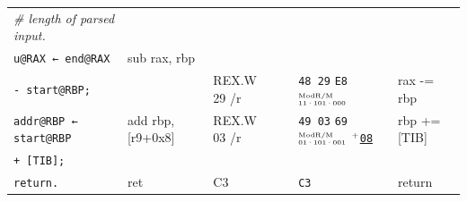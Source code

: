 \documentclass[a4paper,12pt,final]{article}
\begin{document}
\begin{table}[!htbp]
\begin{adjustwidth}{-1cm}{-1cm}
\begin{center}
\begin{tabular}{l|ll|l|lH}
\hspace{1.053000em} \emph{\# length of parsed input.} &  &  &  &  & \\[0pt]
\hspace{1.053000em} \texttt{u@RAX ← end@RAX} & sub rax, rbp &  &  &  & \\[0pt]
\hspace{4.212000em}       \texttt{- start@RBP;} &  & REX.W 29 /r &  & \texttt{48 29} \texttt{E8}​\(^{\text{\tiny ModR/M}}_{\text{\tiny 11·101·000}}\) & rax -= rbp\\[0pt]
\hspace{1.053000em} \texttt{addr@RBP ← start@RBP} & add rbp, [r9+0x8] & REX.W 03 /r &  & \texttt{49 03} \texttt{69}​\(^{\text{\tiny ModR/M}}_{\text{\tiny 01·101·001}}\) \(^{\text{\tiny +}}\)​\uline{\texttt{08}} & rbp += [TIB]\\[0pt]
\hspace{5.791500em}          \texttt{+ [TIB];} &  &  &  &  & \\[0pt]
\hspace{1.053000em} \texttt{return.} & ret & C3 &  & \texttt{C3} & return\\[0pt]
\end{tabular}

\end{center}
\normalsize \end{adjustwidth} \end{table} \vspace{0}
\end{document}
